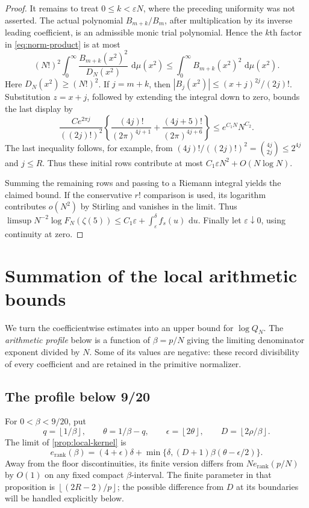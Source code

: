 \documentclass[11pt,letterpaper]{article}
\theoremstyle{definition}
\newcommand{\dd}{\,\mathrm d}
\newcommand{\floor}[1]{\left\lfloor #1\right\rfloor}
\begin{document}
\begin{proof}
It remains to treat $0\le k<\varepsilon N$, where the preceding uniformity
was not asserted. The actual polynomial $B_{m+k}/B_m$, after multiplication
by its inverse leading coefficient, is an admissible monic trial
polynomial. Hence the $k$th factor in \eqref{eq:norm-product} is at most
\[
 (N!)^2\int_0^\infty\frac{B_{m+k}(x^2)^2}{D_N(x^2)}
                         \,\dd\mu(x^2)
 \le\int_0^\infty B_{m+k}(x^2)^2\,\dd\mu(x^2).
\]
Here $D_N(x^2)\ge(N!)^2$. If $j=m+k$, then
$|B_j(x^2)|\le(x+j)^{2j}/(2j)!$. Substitution $z=x+j$, followed by extending
the integral down to zero, bounds the last display by
\[
 \frac{Ce^{2\pi j}}{((2j)!)^2}
 \left\{\frac{(4j)!}{(2\pi)^{4j+1}}
       +\frac{(4j+5)!}{(2\pi)^{4j+6}}\right\}
 \le e^{C_1N}N^{C_2}.
\]
The last inequality follows, for example, from
$(4j)!/((2j)!)^2=\binom{4j}{2j}\le2^{4j}$ and $j\le R$.
Thus these initial rows contribute at most
$C_1\varepsilon N^2+O(N\log N)$.

Summing the remaining rows and passing to a Riemann integral yields
the claimed bound. If the conservative $r!$ comparison is used, its
logarithm contributes $o(N^2)$ by Stirling and vanishes in the limit.
Thus $\limsup N^{-2}\log F_N(\zeta(5))
\le C_1\varepsilon+\int_\varepsilon^\delta f_s(u)\,\dd u$.
Finally let $\varepsilon\downarrow0$, using continuity at zero.
\end{proof}


\section{Summation of the local arithmetic bounds}\label{sec:arithmetic}

We turn the coefficientwise estimates into an upper bound for
$\log Q_N$. The \emph{arithmetic profile} below is a function of
$\beta=p/N$ giving the limiting denominator exponent divided by $N$.
Some of its values are negative: these record divisibility of every
coefficient and are retained in the primitive normalizer.

\subsection{The profile below 9/20}
For $0<\beta<9/20$, put
\[
 q=\floor{1/\beta},\qquad
 \theta=1/\beta-q,\qquad
 \epsilon=\floor{2\theta},\qquad
 D=\floor{2\rho/\beta}.
\]
The limit of \cref{prop:local-kernel} is
\begin{equation}\label{eq:rank-profile}
 e_{\mathrm{rank}}(\beta)
 =(4+\epsilon)\delta+
 \min\{\delta,(D+1)\beta(\theta-\epsilon/2)\}.
\end{equation}
Away from the floor discontinuities, its finite version differs from
$Ne_{\mathrm{rank}}(p/N)$ by $O(1)$ on any fixed compact $\beta$-interval.
The finite parameter in that proposition is
$\floor{(2R-2)/p}$; the possible difference from $D$ at its boundaries
will be handled explicitly below.
\end{document}
